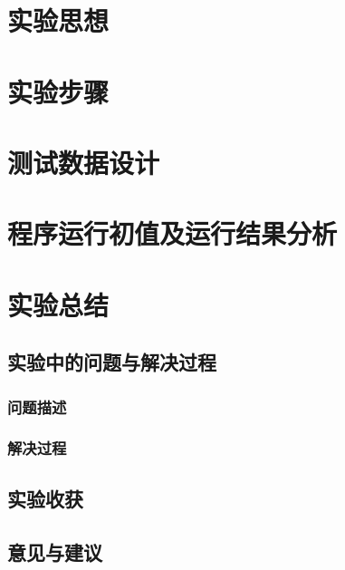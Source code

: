 \documentclass[forprint]{WHUBachelor}
\begin{document}
 \section{实验思想}

 \section{实验步骤}

 \section{测试数据设计}
 
 \section{程序运行初值及运行结果分析}
 
 \section{实验总结}
 
 \subsection{实验中的问题与解决过程}
 
 \subsubsection{问题描述}
 
 \subsubsection{解决过程}
 
 \subsection{实验收获}
 
 \subsection{意见与建议}
 




\end{document}
